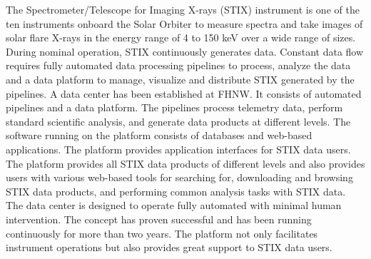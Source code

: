 \documentclass[referee]{aa} %
\begin{document}
  \abstract
   { The Spectrometer/Telescope for Imaging X-rays (STIX) instrument is one 
   of the ten instruments onboard the Solar Orbiter to measure spectra and take images of solar flare X-rays in the energy range of 4 to 150 keV over a wide range of sizes.} %
   {During nominal operation, STIX continuously generates data. Constant data flow requires fully automated data processing pipelines to process,
     analyze the data and a data platform to manage, 
   visualize and distribute STIX generated by the pipelines.   
   }
   {
   A data center has been established at FHNW. 
   It consists of automated pipelines and a data platform.
   The pipelines process telemetry data, perform standard scientific analysis, and generate data products at different levels.  
   The software running on the platform 
   consists of databases and web-based applications. The platform provides application interfaces for STIX data users. }
   {
 The platform provides  all STIX data products of different levels and also provides users 
 with various web-based tools for searching for, downloading and  browsing STIX data products, 
 and performing common analysis tasks with STIX data. 
  The data center is designed to operate fully automated with minimal human intervention. The concept has proven successful 
 and has been running continuously for more than two years. The platform not only facilitates instrument operations but also provides great support to STIX data users.}
 {}
   \maketitle

\end{document}
